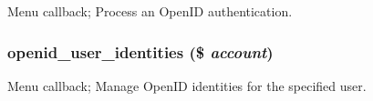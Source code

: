 Menu callback; Process an OpenID authentication. \hypertarget{openid_8pages_8inc_0f409e32ec8c303f8143f13f79eae76c}{
\subsubsection[{openid\_\-user\_\-identities}]{\setlength{\rightskip}{0pt plus 5cm}openid\_\-user\_\-identities (\$ {\em account})}}
\label{openid_8pages_8inc_0f409e32ec8c303f8143f13f79eae76c}


Menu callback; Manage OpenID identities for the specified user. 
